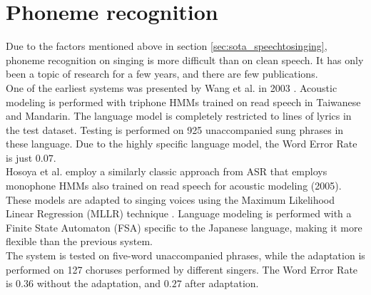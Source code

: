 \section{Phoneme recognition} \label{sec:sota_phonerec}
Due to the factors mentioned above in section \ref{sec:sota_speechtosinging}, phoneme recognition on singing is more difficult than on clean speech. It has only been a topic of research for a few years, and there are few publications.\\
One of the earliest systems was presented by Wang et al. in 2003 \cite{WangLC03}. Acoustic modeling is performed with triphone HMMs trained on read speech in Taiwanese and Mandarin. The language model is completely restricted to lines of lyrics in the test dataset. Testing is performed on 925 unaccompanied sung phrases in these language. Due to the highly specific language model, the Word Error Rate is just $0.07$.\\

Hosoya et al. employ a similarly classic approach from ASR that employs monophone HMMs also trained on read speech for acoustic modeling \cite{Hosoya2005} (2005). These models are adapted to singing voices using the Maximum Likelihood Linear Regression (MLLR) technique \cite{mllr}. Language modeling is performed with a Finite State Automaton (FSA) specific to the Japanese language, making it more flexible than the previous system.\\
The system is tested on five-word unaccompanied phrases, while the adaptation is performed on 127 choruses performed by different singers. The Word Error Rate is $0.36$ without the adaptation, and $0.27$ after adaptation.\\

